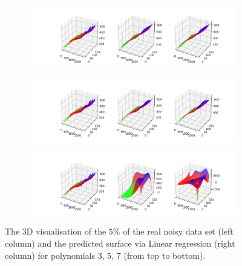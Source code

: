  \begin{figure}[ht]
\begin{subfigure}{\textwidth}
  \centering
  \includegraphics[width=1\linewidth]{images/real_part/real_linear_p03_nreal.png}
\end{subfigure}
\begin{subfigure}{\textwidth}
  \centering
  \includegraphics[width=1\linewidth]{images/real_part/real_linear_p05_nreal.png}
\end{subfigure}
\begin{subfigure}{\textwidth}
  \centering
  \includegraphics[width=1\linewidth]{images/real_part/real_linear_p07_nreal.png}
\end{subfigure}
\caption{The 3D visualisation of the $5\%$ of the real noisy data set (left column) and the predicted surface via Linear regression (right column) for polynomials 3, 5, 7 (from top to bottom).}
\label{fig:linear-surf-real-small}
\end{figure}

